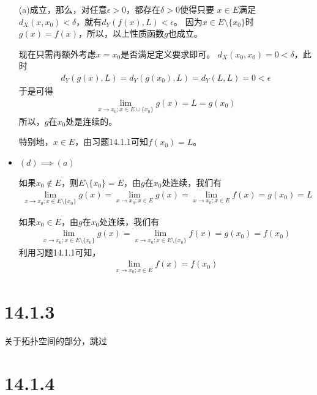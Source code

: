 \documentclass{article}
\begin{document}
\begin{itemize}
        (a)成立，那么，对任意$\epsilon > 0$，都存在$\delta > 0$使得只要
        $x \in E$满足$d_X(x, x_0) < \delta$，就有$d_Y(f(x), L) < \epsilon$。
        因为$x \in E \setminus \{x_0\}$时$g(x) = f(x)$，所以，以上性质函数$g$也成立。

        现在只需再额外考虑$x = x_0$是否满足定义要求即可。
        $d_X(x_0, x_0) = 0 < \delta$，此时
        \begin{align*}
          d_Y(g(x), L) = d_Y(g(x_0), L) = d_Y(L, L) = 0 < \epsilon
        \end{align*}
        于是可得
        \begin{align*}
          \lim\limits_{x \to x_0; x \in E \cup \{x_0\}} g(x) = L = g(x_0)
        \end{align*}
        所以，$g$在$x_0$处是连续的。

        特别地，$x \in E$，由习题14.1.1可知$f(x_0) = L$。

  \item $(d) \implies (a)$

        如果$x_0 \notin E$，则$E \setminus \{x_0\} = E$，由$g$在$x_0$处连续，我们有
        \begin{align*}
          \lim\limits_{x \to x_0; x \in E \setminus \{x_0\}} g(x) = \lim\limits_{x \to x_0; x \in E} g(x) = \lim\limits_{x \to x_0; x \in E} f(x) = g(x_0) = L
        \end{align*}

        如果$x_0 \in E$，由$g$在$x_0$处连续，我们有
        \begin{align*}
          \lim\limits_{x \to x_0; x \in E \setminus \{x_0\}} g(x) = \lim\limits_{x \to x_0; x \in E \setminus \{x_0\}} f(x) = g(x_0) = f(x_0)
        \end{align*}
        利用习题14.1.1可知，
        \begin{align*}
          \lim\limits_{x \to x_0; x \in E} f(x) = f(x_0)
        \end{align*}
\end{itemize}

\section*{14.1.3}

关于拓扑空间的部分，跳过

\section*{14.1.4}
\end{document}
